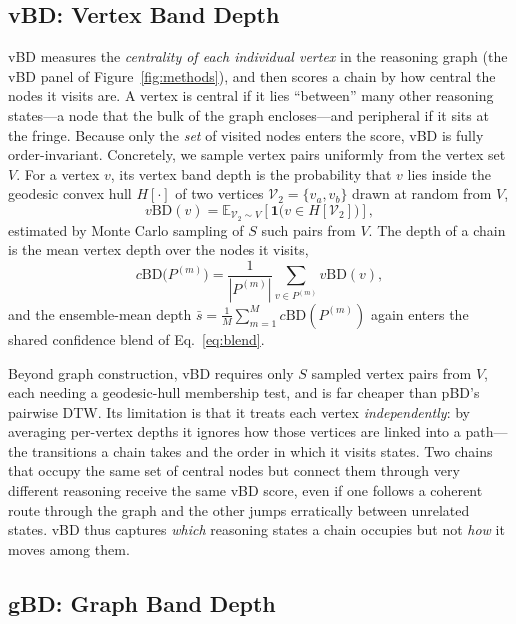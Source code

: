 \documentclass[11pt]{article}
\begin{document}
\subsection{vBD: Vertex Band Depth}
\label{sec:method:vbd}

vBD measures the \emph{centrality of each individual vertex} in the reasoning
graph (the vBD panel of Figure~\ref{fig:methods}), and then scores a chain by how
central the nodes it visits are. A vertex is central if it lies ``between'' many other reasoning
states---a node that the bulk of the graph encloses---and peripheral if it sits
at the fringe. Because
only the \emph{set} of visited nodes enters the score, vBD is fully
order-invariant. Concretely, we sample vertex pairs uniformly from the vertex set $V$. For a
vertex $v$, its vertex band depth is the probability that $v$ lies inside the
geodesic convex hull $H[\cdot]$ of two vertices
$\mathcal{V}_2 = \{v_a, v_b\}$ drawn at random from $V$,
\begin{equation}
  v\text{BD}(v) = \mathbb{E}_{\mathcal{V}_2 \sim V}\!\left[ \mathbf{1}\big(v \in H[\mathcal{V}_2]\big) \right],
\end{equation}
estimated by Monte Carlo sampling of $S$ such pairs from $V$. The depth of a
chain is the mean vertex depth over the nodes it visits,
\begin{equation}
  c\text{BD}\big(P^{(m)}\big) = \frac{1}{|P^{(m)}|} \sum_{v \in P^{(m)}} v\text{BD}(v),
\end{equation}
and the ensemble-mean depth $\bar{s} = \frac{1}{M} \sum_{m=1}^{M} c\text{BD}(P^{(m)})$
again enters the shared confidence blend of Eq.~\eqref{eq:blend}.

Beyond graph construction, vBD requires only $S$ sampled vertex pairs from $V$,
each needing a geodesic-hull membership test, and is far cheaper than pBD's
pairwise DTW. Its limitation is that it treats each vertex \emph{independently}:
by averaging per-vertex depths it ignores how those vertices are linked into a
path---the transitions a chain takes and the order in which it visits states.
Two chains that occupy the same set of central nodes but connect them through
very different reasoning receive the same vBD score, even if one follows a
coherent route through the graph and the other jumps erratically between
unrelated states. vBD thus captures \emph{which} reasoning states a chain
occupies but not \emph{how} it moves among them.

\subsection{gBD: Graph Band Depth}
\label{sec:method:gbd}
\end{document}

